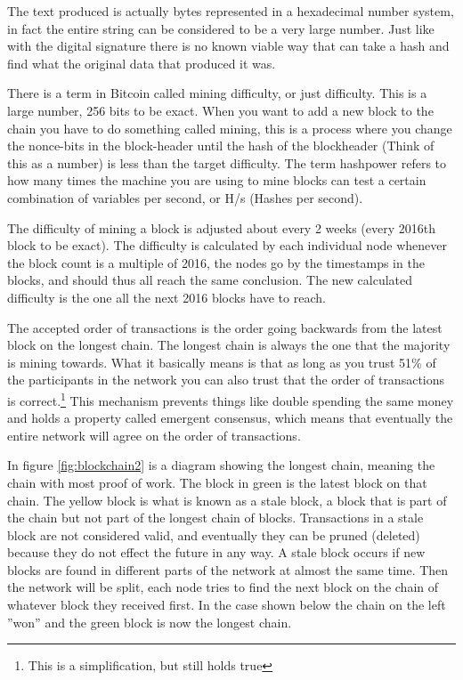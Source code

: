 The text produced is actually bytes represented in a hexadecimal number system,
in fact the entire string can be considered to be a very large number. Just like
with the digital signature there is no known viable way that can take a hash and
find what the original data that produced it was.

There is a term in Bitcoin called mining difficulty, or just difficulty. This
is a large number, 256 bits to be exact. When you want to add a new block to
the chain you have to do something called mining, this is a process where you
change the nonce-bits in the block-header until the hash of the blockheader (Think
of this as a number) is less than the target difficulty. The term hashpower refers
to how many times the machine you are using to mine blocks can test a certain
combination of variables per second, or H/s (Hashes per second).

The difficulty of mining a block is adjusted about every 2 weeks (every 2016th block to be exact). The difficulty
is calculated by each individual node whenever the block count is a multiple of 2016, the nodes go by the timestamps in the blocks, and should thus all reach the same conclusion. The new calculated difficulty is the one all the next 2016 blocks have to reach.\cite{antonopoulos_2017}

The accepted order of transactions is the order going backwards from the latest
block on the longest chain. The longest chain is always the one that the majority
is mining towards. What it basically
means is that as long as you trust 51\% of the participants in the network you
can also trust that the order of transactions is correct.\footnote{This is a simplification, but still holds true} This mechanism
prevents things like double spending the same money and holds a property called
emergent consensus, which means that eventually the entire network will agree
on the order of transactions.

In figure \ref{fig:blockchain2} is a diagram showing the longest chain, meaning
the chain with most proof of work. The block in green is the latest block on
that chain. The yellow block is what is known as a stale block, a block that is
part of the chain but not part of the longest chain of blocks. Transactions in
a stale block are not considered valid, and eventually they can be pruned
(deleted) because they do not effect the future in any way. A stale block occurs
if new blocks are found in different parts of the network at almost the same
time. Then the network will be split, each node tries to find the next block on
the chain of whatever block they received first. In the case shown below the
chain on the left ''won'' and the green block is now the longest chain.

